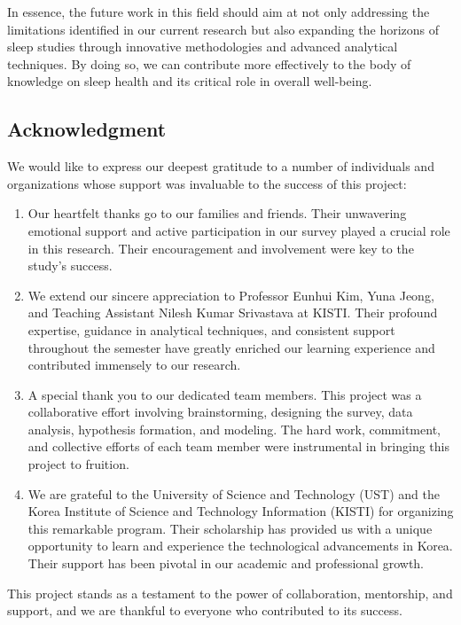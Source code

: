\documentclass[conference]{IEEEtran}
\begin{document}
In essence, the future work in this field should aim at not only addressing the limitations identified in our current research but also expanding the horizons of sleep studies through innovative methodologies and advanced analytical techniques. By doing so, we can contribute more effectively to the body of knowledge on sleep health and its critical role in overall well-being.


\subsection*{Acknowledgment}

We would like to express our deepest gratitude to a number of individuals and organizations whose support was invaluable to the success of this project:

\begin{enumerate}
    \item Our heartfelt thanks go to our families and friends. Their unwavering emotional support and active participation in our survey played a crucial role in this research. Their encouragement and involvement were key to the study's success.
    
    \item We extend our sincere appreciation to Professor Eunhui Kim, Yuna Jeong, and Teaching Assistant Nilesh Kumar Srivastava at KISTI. Their profound expertise, guidance in analytical techniques, and consistent support throughout the semester have greatly enriched our learning experience and contributed immensely to our research.
    
    \item A special thank you to our dedicated team members. This project was a collaborative effort involving brainstorming, designing the survey, data analysis, hypothesis formation, and modeling. The hard work, commitment, and collective efforts of each team member were instrumental in bringing this project to fruition.
    
    \item We are grateful to the University of Science and Technology (UST) and the Korea Institute of Science and Technology Information (KISTI) for organizing this remarkable program. Their scholarship has provided us with a unique opportunity to learn and experience the technological advancements in Korea. Their support has been pivotal in our academic and professional growth.
\end{enumerate}

This project stands as a testament to the power of collaboration, mentorship, and support, and we are thankful to everyone who contributed to its success.



\end{document}
